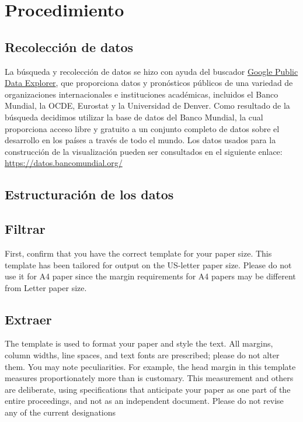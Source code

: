 \documentclass[letterpaper, 12 pt, conference]{ieeeconf}  %
\begin{document}
\section{Procedimiento}

\subsection{Recolección de datos}
La búsqueda y recolección de datos se hizo con ayuda del buscador \href{https://www.google.com/publicdata}{Google Public Data Explorer}, que proporciona datos y pronósticos públicos de una variedad de organizaciones internacionales e instituciones académicas, incluidos el Banco Mundial, la OCDE, Eurostat y la Universidad de Denver. 
Como resultado de la búsqueda decidimos utilizar la base de datos del Banco Mundial, la cual proporciona acceso libre y gratuito a un conjunto completo de datos sobre el desarrollo en los países a través de todo el mundo. Los datos usados para la construcción de la visualización pueden ser consultados en el siguiente enlace: \url{https://datos.bancomundial.org/} 

\subsection{Estructuración  de  los  datos}


\subsection{Filtrar}

First, confirm that you have the correct template for your paper size. This template has been tailored for output on the US-letter paper size. Please do not use it for A4 paper since the margin requirements for A4 papers may be different from Letter paper size.

\subsection{Extraer}

The template is used to format your paper and style the text. All margins, column widths, line spaces, and text fonts are prescribed; please do not alter them. You may note peculiarities. For example, the head margin in this template measures proportionately more than is customary. This measurement and others are deliberate, using specifications that anticipate your paper as one part of the entire proceedings, and not as an independent document. Please do not revise any of the current designations
\end{document}
